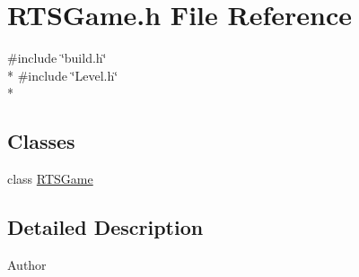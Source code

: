 \section{R\-T\-S\-Game.\-h File Reference}
\label{_r_t_s_game_8h}
{\ttfamily \#include \char`\"{}build.\-h\char`\"{}}\\*
{\ttfamily \#include \char`\"{}Level.\-h\char`\"{}}\\*
\subsection*{Classes}
\begin{DoxyCompactItemize}
\item 
class \hyperlink{class_r_t_s_game}{R\-T\-S\-Game}
\end{DoxyCompactItemize}


\subsection{Detailed Description}
\begin{DoxyAuthor}{Author}

\end{DoxyAuthor}
